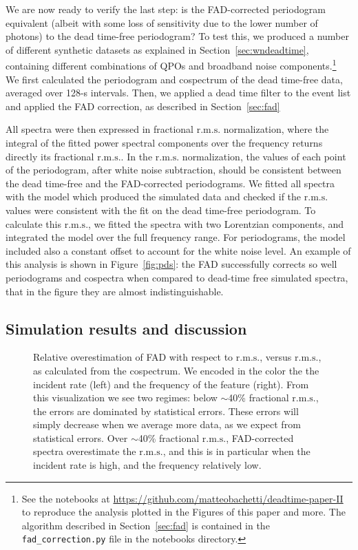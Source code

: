\documentclass[twocolumn]{aastex61}
\newcommand{\rms}{\ensuremath{\mathrm{r.m.s.}}\xspace}
\begin{document}
We are now ready to verify the last step: is the FAD-corrected periodogram equivalent (albeit with some loss of sensitivity due to the lower number of photons) to the dead time-free periodogram?
To test this, we produced a number of different synthetic datasets as explained in Section~\ref{sec:wndeadtime}, containing different combinations of QPOs and broadband noise components.\footnote{See the notebooks at \href{https://github.com/matteobachetti/deadtime-paper-II}{https://github.com/matteobachetti/deadtime-paper-II} to reproduce the analysis plotted in the Figures of this paper and more. The algorithm described in Section~\ref{sec:fad} is contained in the \texttt{fad\_correction.py} file in the notebooks directory.}
We first calculated the periodogram and cospectrum of the dead time-free data, averaged over 128-s intervals.
Then, we applied a dead time filter to the event list and applied the FAD correction, as described in Section~\ref{sec:fad}

All spectra were then expressed in fractional \rms normalization, where the integral of the fitted power spectral components over the frequency returns directly its fractional \rms.
In the \rms normalization, the values of each point of the periodogram, after white noise subtraction, should be consistent between the dead time-free and the FAD-corrected periodograms.
We fitted all spectra with the model which produced the simulated data and checked if the \rms values were consistent with the fit on the dead time-free periodogram.
To calculate this \rms, we fitted the spectra with two Lorentzian components, and integrated the model over the full frequency range.
For periodograms, the model included also a constant offset to account for the white noise level.
An example of this analysis is shown in Figure~\ref{fig:pds}: the FAD successfully corrects so well periodograms and cospectra when compared to dead-time free simulated spectra, that in the figure they are almost indistinguishable.

\subsection{Simulation results and discussion}\label{sec:caveat}
\begin{figure*}
    \caption{Relative overestimation of FAD with respect to \rms, versus \rms, as calculated from the cospectrum.  
    We encoded in the color the  the incident rate (left) and the frequency of the feature (right).
    From this visualization we see two regimes: below $\sim$40\% fractional \rms, the errors are dominated by statistical errors. 
    These errors will simply decrease when we average more data, as we expect from statistical errors.
    Over $\sim$40\% fractional \rms, FAD-corrected spectra overestimate the \rms, and this is 
    in particular when the incident rate is high, and the frequency relatively low. }
    \label{fig:errors}
\end{figure*}
\end{document}

